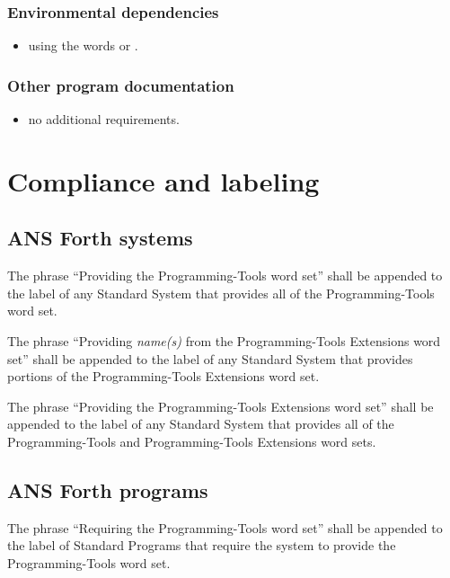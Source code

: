 \subsubsection{Environmental dependencies} %

\begin{itemize}
\item using the words  or
	.
\end{itemize}

\subsubsection{Other program documentation} %

\begin{itemize}
\item no additional requirements.
\end{itemize}

\section{Compliance and labeling} %

\subsection{ANS Forth systems} %

The phrase ``Providing the Programming-Tools word set'' shall be
appended to the label of any Standard System that provides all of
the Programming-Tools word set.

The phrase ``Providing \emph{name(s)} from the Programming-Tools
Extensions word set'' shall be appended to the label of any Standard
System that provides portions of the Programming-Tools Extensions
word set.

The phrase ``Providing the Programming-Tools Extensions word set''
shall be appended to the label of any Standard System that provides
all of the Programming-Tools and Programming-Tools Extensions word
sets.

\subsection{ANS Forth programs} %

The phrase ``Requiring the Programming-Tools word set'' shall be
appended to the label of Standard Programs that require the system
to provide the Programming-Tools word set.

